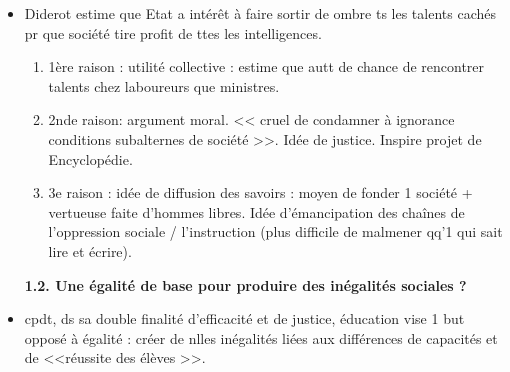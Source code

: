 \documentclass[12pt]{report}
\begin{document}
\begin{itemize}
\item Diderot estime que Etat a intérêt à faire sortir de ombre ts les talents cachés pr que société tire profit de ttes les intelligences.
\begin{enumerate}
\item 1ère raison : utilité collective : estime que autt de chance de rencontrer talents chez laboureurs que ministres. \\
\item 2nde raison: argument moral. << cruel de condamner à ignorance conditions subalternes de société >>. Idée de justice. Inspire projet de Encyclopédie.\\
\item 3e raison : idée de diffusion des savoirs : moyen de fonder 1 société + vertueuse faite d'hommes libres. Idée d'émancipation des chaînes de l'oppression sociale / l'instruction (plus difficile de malmener qq'1 qui sait lire et écrire). \\

\end{enumerate}

\textbf{1.2. Une égalité de base pour produire des inégalités sociales ?}

\item cpdt, ds sa double finalité d'efficacité et de justice, éducation vise 1 but opposé à égalité : créer de nlles inégalités liées aux différences de capacités et de <<réussite des élèves >>.


\end{itemize}
\end{document}
